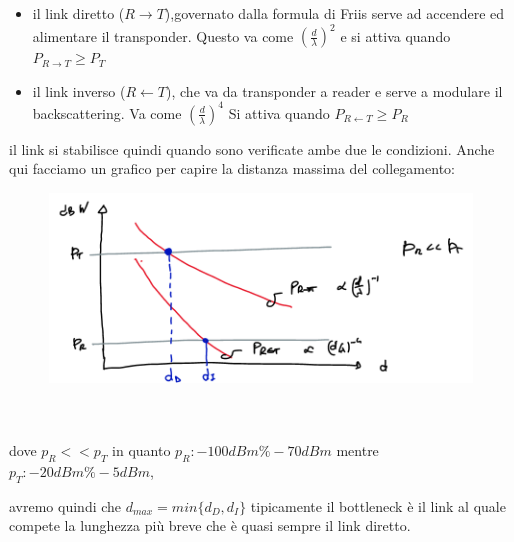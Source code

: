 \documentclass[oneside, 12pt]{extbook}
\begin{document}
\begin{itemize}
	\item il link diretto ($R \rightarrow T$),governato dalla formula di Friis serve ad accendere ed alimentare il transponder. Questo va come $(\frac{d}{\lambda})^2$ e si attiva quando $P_{R \rightarrow T} \geq P_T$
	\item il link inverso ($R \leftarrow T$), che va da transponder a reader e serve a modulare il backscattering. Va come $(\frac{d}{\lambda})^4$ Si attiva quando $P_{R \leftarrow T} \geq P_R$
\end{itemize}
il link si stabilisce quindi quando sono verificate ambe due le condizioni. Anche qui facciamo un grafico per capire la distanza massima del collegamento:\\
\begin{figure}[!h]
	\includegraphics[scale=0.2]{immagini/bs_max_d.png}
\end{figure}
\\\\ dove $p_R << p_T$ in quanto $p_R: -100dBm \% -70 dBm$ mentre $p_T: -20 dBm \% -5 dBm$, 

avremo quindi che $d_{max} = min\{d_D, d_I\}$ tipicamente il bottleneck è il link al quale compete la lunghezza più breve che è quasi sempre il link diretto.
\end{document}
